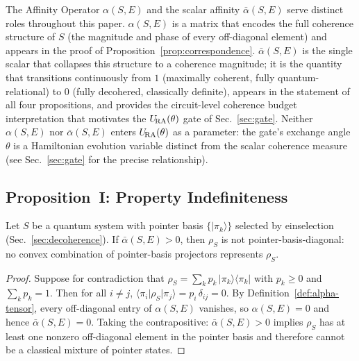 \begin{remark}
\label{rem:tensor-vs-scalar}
The Affinity Operator $\alpha(S,E)$ and the scalar affinity
$\bar{\alpha}(S,E)$ serve distinct roles throughout this paper.
$\alpha(S,E)$ is a matrix that encodes the full coherence structure of $S$ (the magnitude and phase of every off-diagonal element) and appears in the proof of
Proposition~\ref{prop:correspondence}.
$\bar{\alpha}(S,E)$ is the single scalar that collapses this structure
to a coherence magnitude; it is the quantity that transitions
continuously from $1$ (maximally coherent, fully quantum-relational)
to $0$ (fully decohered, classically definite), appears in the
statement of all four propositions, and provides the
circuit-level coherence budget interpretation that motivates the
$U_{\!\mathrm{RA}}(\theta)$ gate of Sec.~\ref{sec:gate}.
Neither $\alpha(S,E)$ nor $\bar{\alpha}(S,E)$ enters $U_{\!\mathrm{RA}}(\theta)$ as
a parameter: the gate's exchange angle $\theta$ is a Hamiltonian
evolution variable distinct from the scalar coherence measure
(see Sec.~\ref{sec:gate} for the precise relationship).
\end{remark}


\subsection{\label{sec:prop1}Proposition~I: Property Indefiniteness}

\begin{proposition}
\label{prop:indefiniteness}
Let $S$ be a quantum system with pointer basis
$\{\vert\pi_k\rangle\}$ selected by einselection
(Sec.~\ref{sec:decoherence}).
If $\bar{\alpha}(S,E) > 0$, then $\rho_S$ is not pointer-basis-diagonal:
no convex combination of pointer-basis projectors represents $\rho_S$.
\end{proposition}

\begin{proof}
Suppose for contradiction that
$\rho_S = \sum_k p_k\,\vert\pi_k\rangle\langle\pi_k\vert$
with $p_k \geq 0$ and $\sum_k p_k = 1$.
Then for all $i \neq j$,
$\langle\pi_i\vert\rho_S\vert\pi_j\rangle = p_i\,\delta_{ij} = 0$.
By Definition~\ref{def:alpha-tensor}, every off-diagonal entry of
$\alpha(S,E)$ vanishes, so $\alpha(S,E) = 0$ and hence
$\bar{\alpha}(S,E) = 0$.
Taking the contrapositive: $\bar{\alpha}(S,E) > 0$ implies $\rho_S$
has at least one nonzero off-diagonal element in the pointer basis
and therefore cannot be a classical mixture of pointer states.
\end{proof}

